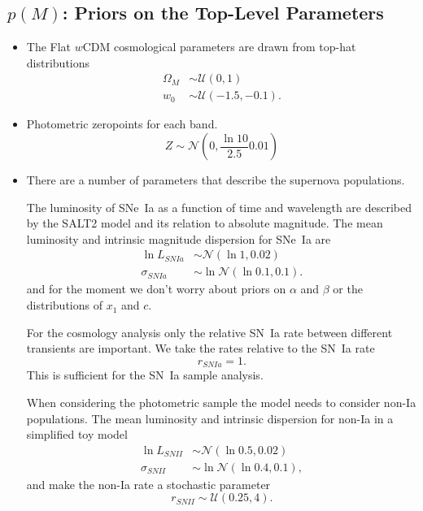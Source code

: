 \documentclass[preprint,3p]{elsarticle}
\begin{document}
\subsection{$p(M)$: Priors on the Top-Level Parameters}
\begin{itemize}
\item
The Flat $w$CDM cosmological parameters are drawn from top-hat distributions
\begin{align}
\Omega_M & \sim  {\mathcal{U}}(0,1)\\
w_0 & \sim \mathcal{U}(-1.5, -0.1).
\end{align}

\item
Photometric zeropoints for each band.
\begin{equation}
Z \sim \mathcal{N}\left(0,\frac{\ln{10}}{2.5}0.01\right)
\end{equation}


\item
There are a number of parameters that describe the supernova populations.

The luminosity of SNe~Ia as a function of time and wavelength are described by the SALT2 model and
its relation to absolute magnitude.
The mean luminosity and intrinsic magnitude dispersion for SNe~Ia are
\begin{align}
\ln{L}_{SNIa} & \sim \mathcal{N}(\ln{1}, 0.02) \\
\sigma_{SNIa} & \sim \ln{\mathcal{N}}(\ln{0.1},0.1).
\end{align}
and for the moment we don't worry about priors on $\alpha$ and $\beta$ or the distributions of $x_1$ and $c$.

For the cosmology analysis only the relative SN~Ia rate between different transients are important.
We take the rates relative to the SN~Ia rate
\begin{equation}
r_{SNIa} = 1.
\end{equation}
This is sufficient for the SN~Ia sample analysis.

When considering the photometric sample the model needs to consider non-Ia populations.
The mean luminosity and intrinsic dispersion for non-Ia in a simplified toy model
\begin{align}
\ln{L}_{SNII} & \sim \mathcal{N}(\ln{0.5}, 0.02) \\
\sigma_{SNII} & \sim \ln{\mathcal{N}}(\ln{0.4},0.1),
\end{align}
and make the non-Ia rate a stochastic parameter
\begin{equation}
r_{SNII} \sim \mathcal{U}(0.25, 4).
\end{equation}

\end{itemize}
\end{document}
